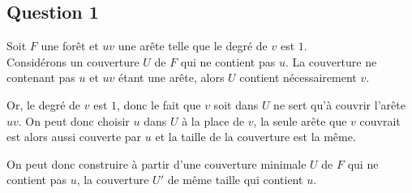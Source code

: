   \subsection{Question 1\label{part1q1}}
  Soit $F$ une forêt et $uv$ une arête telle que le degré de $v$ est
  $1$.\\

  Considérons un couverture $U$ de $F$ qui ne contient pas $u$. La
  couverture ne contenant pas $u$ et $uv$ étant une arête, alors $U$
  contient nécessairement $v$.

  Or, le degré de $v$ est $1$, donc le fait que $v$ soit dans $U$ ne
  sert qu'à couvrir l'arête $uv$. On peut donc choisir $u$ dans $U$ à la
  place de $v$, la seule arête que $v$ couvrait est alors aussi couverte
  par $u$ et la taille de la couverture est la même.
  
  On peut donc construire à partir d'une couverture minimale $U$ de $F$
  qui ne contient pas $u$, la couverture $U'$ de même taille qui
  contient $u$.\\

  